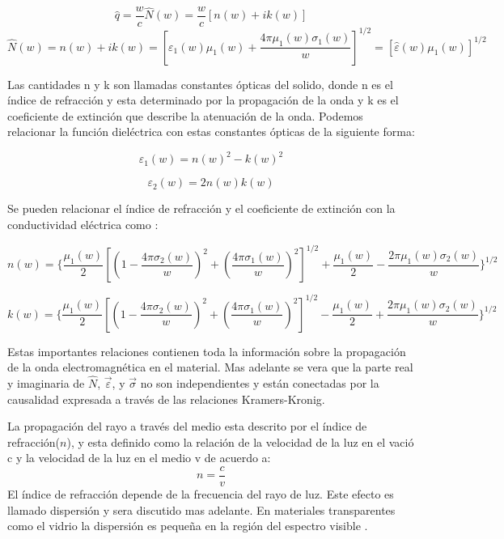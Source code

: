 \documentclass[a4paper,openright,12pt]{book}
\begin{document}
\begin{equation}\label{1.19}
\hat{q}=\frac{w}{c}\hat{N}(w)=\frac{w}{c}[n(w)+ik(w)]
\end{equation}
\begin{equation}\label{1.20}
\hat{N}(w)=n(w)+ik(w)=[\varepsilon_{1}(w)\mu_{1}(w)+\frac{4\pi\mu_{1}(w)\sigma_{1}(w)}{w}]^{1/2}=[\hat{\varepsilon}(w)\mu_{1}(w)]^{1/2}
\end{equation}

Las cantidades n y k son llamadas constantes ópticas del solido, donde n es el índice de refracción y esta determinado por la propagación de la onda y k es el coeficiente de extinción que describe la atenuación de la onda. Podemos relacionar la función dieléctrica con estas constantes ópticas de la siguiente forma:

\begin{equation}
\varepsilon_{1}(w)=n(w)^{2}-k(w)^{2}
\end{equation}

\begin{equation}
\varepsilon_{2}(w)=2n(w)k(w)
\end{equation}

Se pueden relacionar el índice de refracción y el coeficiente de extinción con la conductividad eléctrica como \cite{electrodynamics}:

\begin{equation}\label{1.23}
n(w)=\{\frac{\mu_{1}(w)}{2}[(1-\frac{4\pi\sigma_{2}(w)}{w})^{2}+(\frac{4\pi \sigma_{1}(w)}{w})^{2}]^{1/2}+\frac{\mu_{1}(w)}{2}-\frac{2\pi\mu_{1}(w)\sigma_{2}(w)}{w}\}^{1/2}
\end{equation}

\begin{equation}\label{1.24}
k(w)=\{\frac{\mu_{1}(w)}{2}[(1-\frac{4\pi\sigma_{2}(w)}{w})^{2}+(\frac{4\pi \sigma_{1}(w)}{w})^{2}]^{1/2}-\frac{\mu_{1}(w)}{2}+\frac{2\pi\mu_{1}(w)\sigma_{2}(w)}{w}\}^{1/2}
\end{equation}

Estas importantes relaciones contienen toda la información sobre la propagación de la onda electromagnética en el material. Mas adelante se vera que la parte real y imaginaria de $\hat{N}$, $\vec{\varepsilon}$, y $\vec{\sigma}$ no son independientes y están conectadas por la causalidad expresada a través de las relaciones Kramers-Kronig.


La propagación del rayo a través del medio esta descrito por el índice de refracción($n$), y esta definido como la relación de la velocidad de la luz en el vació c y la velocidad de la luz en el medio v de acuerdo a: \cite{MarkFox}
\begin{equation}
n=\frac{c}{v}
\end{equation}
El índice de refracción depende de la frecuencia del rayo de luz. Este efecto es llamado dispersión
y sera discutido mas adelante. En materiales transparentes como el vidrio la dispersión es pequeña en la región del espectro visible \cite{MarkFox}.
\end{document}
